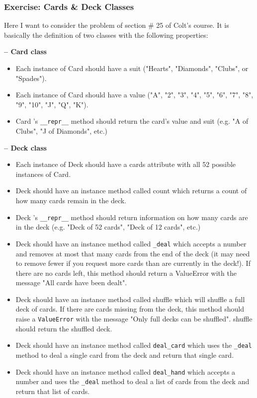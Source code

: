 \subsubsection{Exercise: Cards \& Deck Classes}

Here I want to consider the problem of section \# 25 of Colt's course. It is basically the definition of two classes with the following properties:

\textbf{-- Card class}
\begin{itemize}
    \item Each instance of Card  should have a suit ("Hearts", "Diamonds", "Clubs", or "Spades").
    \item Each instance of Card  should have a value ("A", "2", "3", "4", "5", "6", "7", "8", "9", "10", "J", "Q", "K").
    \item Card 's \verb|__repr__| method should return the card's value and suit (e.g. "A of Clubs", "J of Diamonds", etc.)
\end{itemize}


\textbf{-- Deck class}
\begin{itemize}
    \item Each instance of Deck should have a cards attribute with all 52 possible instances of Card.
    \item Deck  should have an instance method called count  which returns a count of how many cards remain in the deck.
    \item Deck 's \verb|__repr__| method should return information on how many cards are in the deck (e.g. "Deck of 52 cards", "Deck of 12 cards", etc.)
    \item Deck  should have an instance method called \verb|_deal|  which accepts a number and removes at most that many cards from the end of the deck (it may need to remove fewer if you request more cards than are currently in the deck!). If there are no cards left, this method should return a ValueError  with the message "All cards have been dealt".
    \item Deck  should have an instance method called shuffle  which will shuffle a full deck of cards. If there are cards missing from the deck, this method should raise a \verb|ValueError| with the message "Only full decks can be shuffled". shuffle should return the shuffled deck.
    \item Deck  should have an instance method called \verb|deal_card| which uses the \verb|_deal| method to deal a single card from the deck and return that single card.
    \item Deck  should have an instance method called \verb|deal_hand| which accepts a number and uses the \verb|_deal| method to deal a list of cards from the deck and return that list of cards.
\end{itemize}

